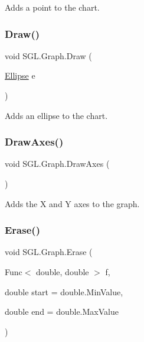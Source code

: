 Adds a point to the chart. 

\mbox{\label{class_s_g_l_1_1_graph_ac0c3219e1779f5c5c6a0041177512198}} 
\subsubsection{\texorpdfstring{Draw()}{Draw()}\hspace{0.1cm}{\footnotesize\ttfamily [6/6]}}
{\footnotesize\ttfamily void S\+G\+L.\+Graph.\+Draw (\begin{DoxyParamCaption}\item[{\mbox{\hyperlink{class_s_g_l_1_1_ellipse}{Ellipse}}}]{e }\end{DoxyParamCaption})\hspace{0.3cm}{\ttfamily [inline]}}



Adds an ellipse to the chart. 

\mbox{\label{class_s_g_l_1_1_graph_ab406eaa6b30080e663cd2152e8fd36d2}} 
\subsubsection{\texorpdfstring{Draw\+Axes()}{DrawAxes()}}
{\footnotesize\ttfamily void S\+G\+L.\+Graph.\+Draw\+Axes (\begin{DoxyParamCaption}{ }\end{DoxyParamCaption})\hspace{0.3cm}{\ttfamily [inline]}}



Adds the X and Y axes to the graph. 

\mbox{\label{class_s_g_l_1_1_graph_ae56a2ac44e31ab8e8dae5dc042e8515d}} 
\subsubsection{\texorpdfstring{Erase()}{Erase()}\hspace{0.1cm}{\footnotesize\ttfamily [1/6]}}
{\footnotesize\ttfamily void S\+G\+L.\+Graph.\+Erase (\begin{DoxyParamCaption}\item[{Func$<$ double, double $>$}]{f,  }\item[{double}]{start = {\ttfamily double.MinValue},  }\item[{double}]{end = {\ttfamily double.MaxValue} }\end{DoxyParamCaption})\hspace{0.3cm}{\ttfamily [inline]}}



